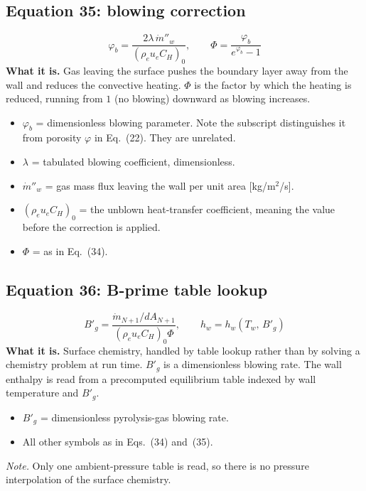 \documentclass[11pt]{article}
\begin{document}
\subsection*{Equation 35: blowing correction}
\begin{equation}
\varphi_b = \frac{2\lambda\, \dot m''_w}{\left(\rho_e u_e C_H\right)_0},
\qquad
\Phi = \frac{\varphi_b}{e^{\varphi_b} - 1}
\end{equation}
\textbf{What it is.} Gas leaving the surface pushes the boundary layer away from
the wall and reduces the convective heating. $\Phi$ is the factor by which the
heating is reduced, running from $1$ (no blowing) downward as blowing increases.
\begin{itemize}
  \item $\varphi_b$ = dimensionless blowing parameter. Note the subscript
        distinguishes it from porosity $\varphi$ in Eq.~(22). They are unrelated.
  \item $\lambda$ = tabulated blowing coefficient, dimensionless.
  \item $\dot m''_w$ = gas mass flux leaving the wall per unit area
        [kg/m$^2$/s].
  \item $\left(\rho_e u_e C_H\right)_0$ = the unblown heat-transfer coefficient,
        meaning the value before the correction is applied.
  \item $\Phi$ = as in Eq.~(34).
\end{itemize}

\subsection*{Equation 36: B-prime table lookup}
\begin{equation}
B'_g = \frac{\dot m_{N+1} / dA_{N+1}}{\left(\rho_e u_e C_H\right)_0 \Phi},
\qquad
h_w = h_w\!\left(T_w,\, B'_g\right)
\end{equation}
\textbf{What it is.} Surface chemistry, handled by table lookup rather than by
solving a chemistry problem at run time. $B'_g$ is a dimensionless blowing rate.
The wall enthalpy is read from a precomputed equilibrium table indexed by wall
temperature and $B'_g$.
\begin{itemize}
  \item $B'_g$ = dimensionless pyrolysis-gas blowing rate.
  \item All other symbols as in Eqs.~(34) and~(35).
\end{itemize}
\textit{Note.} Only one ambient-pressure table is read, so there is no pressure
interpolation of the surface chemistry.
\end{document}
